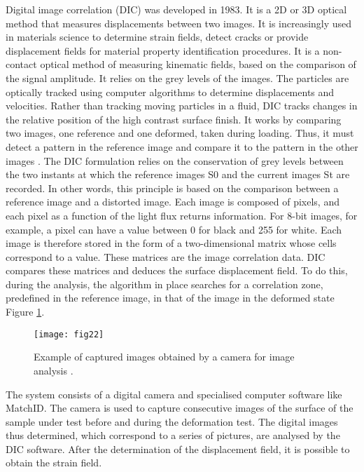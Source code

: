 Digital image correlation (DIC) was developed in 1983. It is a 2D or 3D optical method that measures displacements between two images. It is increasingly used in materials science to determine strain fields, detect cracks or provide displacement fields for material property identification procedures. It is a non-contact optical method of measuring kinematic fields, based on the comparison of the signal amplitude. It relies on the grey levels of the images. The particles are optically tracked using computer algorithms to determine displacements and velocities. Rather than tracking moving particles in a fluid, DIC tracks changes in the relative position of the high contrast surface finish. It works by comparing two images, one reference and one deformed, taken during loading. Thus, it must detect a pattern in the reference image and compare it to the pattern in the other images \citep{Mambili2018}. The DIC formulation relies on the conservation of grey levels between the two instants at which the reference images S0 and the current images St are recorded. In other words, this principle is based on the comparison between a reference image and a distorted image. Each image is composed of pixels, and each pixel as a function of the light flux returns information. For 8-bit images, for example, a pixel can have a value between 0 for black and 255 for white. Each image is therefore stored in the form of a two-dimensional matrix whose cells correspond to a value. These matrices are the image correlation data. DIC compares these matrices and deduces the surface displacement field. To do this, during the analysis, the algorithm in place searches for a correlation zone, predefined in the reference image, in that of the image in the deformed state Figure \ref{fig:fig22}.


\begin{figure}[htp]
	\centering
	\texttt{[image: fig22]}
	\caption{Example of captured images obtained by a camera for image analysis \citep{Mambili2018}.}
	\label{fig:fig22}
\end{figure}

The system consists of a digital camera and specialised computer software like MatchID. The camera is used to capture consecutive images of the surface of the sample under test before and during the deformation test. The digital images thus determined, which correspond to a series of pictures, are analysed by the DIC software. After the determination of the displacement field, it is possible to obtain the strain field.

